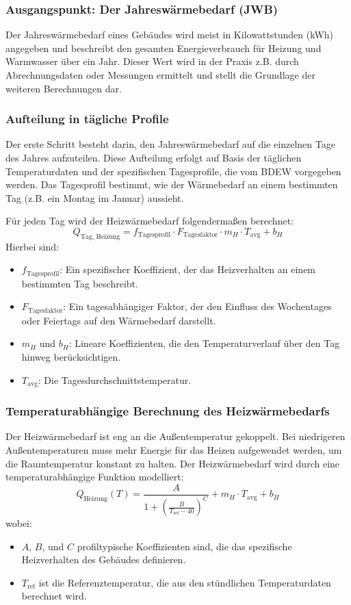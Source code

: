 \subsubsection{Ausgangspunkt: Der Jahreswärmebedarf (JWB)}
Der Jahreswärmebedarf eines Gebäudes wird meist in Kilowattstunden (kWh) angegeben und beschreibt den gesamten Energieverbrauch für Heizung und Warmwasser über ein Jahr. Dieser Wert wird in der Praxis z.B. durch Abrechnungsdaten oder Messungen ermittelt und stellt die Grundlage der weiteren Berechnungen dar.

\subsubsection{Aufteilung in tägliche Profile}
Der erste Schritt besteht darin, den Jahreswärmebedarf auf die einzelnen Tage des Jahres aufzuteilen. Diese Aufteilung erfolgt auf Basis der täglichen Temperaturdaten und der spezifischen Tagesprofile, die vom BDEW vorgegeben werden. Das Tagesprofil bestimmt, wie der Wärmebedarf an einem bestimmten Tag (z.B. ein Montag im Januar) aussieht.

Für jeden Tag wird der Heizwärmebedarf folgendermaßen berechnet:
\[
Q_{\text{Tag, Heizung}} = f_{\text{Tagesprofil}} \cdot F_{\text{Tagesfaktor}} \cdot m_H \cdot T_{\text{avg}} + b_H
\]
\noindent
Hierbei sind:
\begin{itemize}
    \item \( f_{\text{Tagesprofil}} \): Ein spezifischer Koeffizient, der das Heizverhalten an einem bestimmten Tag beschreibt.
    \item \( F_{\text{Tagesfaktor}} \): Ein tagesabhängiger Faktor, der den Einfluss des Wochentages oder Feiertags auf den Wärmebedarf darstellt.
    \item \( m_H \) und \( b_H \): Lineare Koeffizienten, die den Temperaturverlauf über den Tag hinweg berücksichtigen.
    \item \( T_{\text{avg}} \): Die Tagesdurchschnittstemperatur.
\end{itemize}

\subsubsection{Temperaturabhängige Berechnung des Heizwärmebedarfs}
Der Heizwärmebedarf ist eng an die Außentemperatur gekoppelt. Bei niedrigeren Außentemperaturen muss mehr Energie für das Heizen aufgewendet werden, um die Raumtemperatur konstant zu halten. Der Heizwärmebedarf wird durch eine temperaturabhängige Funktion modelliert:
\[
Q_{\text{Heizung}}(T) = \frac{A}{1 + \left( \frac{B}{T_{\text{ref}} - 40} \right)^C} + m_H \cdot T_{\text{avg}} + b_H
\]
wobei:
\begin{itemize}
    \item \( A \), \( B \), und \( C \) profiltypische Koeffizienten sind, die das spezifische Heizverhalten des Gebäudes definieren.
    \item \( T_{\text{ref}} \) ist die Referenztemperatur, die aus den stündlichen Temperaturdaten berechnet wird.
\end{itemize}

